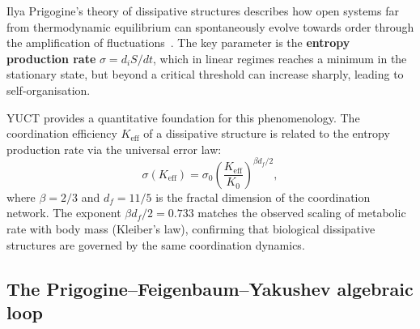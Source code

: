 \documentclass[11pt,a4paper]{article}
\newcommand{\Keff}{K_{\mathrm{eff}}}
\begin{document}
	Ilya Prigogine's theory of dissipative structures describes how open systems far from thermodynamic equilibrium can spontaneously evolve towards order through the amplification of fluctuations~\cite{Prigogine1977}. The key parameter is the \textbf{entropy production rate} \(\sigma = d_iS/dt\), which in linear regimes reaches a minimum in the stationary state, but beyond a critical threshold can increase sharply, leading to self-organisation.
	
	YUCT provides a quantitative foundation for this phenomenology. The coordination efficiency \(K_{\mathrm{eff}}\) of a dissipative structure is related to the entropy production rate via the universal error law:
	\begin{equation}
		\sigma(\Keff) = \sigma_0 \left( \frac{\Keff}{K_0} \right)^{\beta d_f / 2},
		\label{eq:sigma-keff}
	\end{equation}
	where \(\beta = 2/3\) and \(d_f = 11/5\) is the fractal dimension of the coordination network. The exponent \(\beta d_f / 2 = 0.733\) matches the observed scaling of metabolic rate with body mass (Kleiber's law), confirming that biological dissipative structures are governed by the same coordination dynamics.
	
	\subsection{The Prigogine–Feigenbaum–Yakushev algebraic loop}
	
\end{document}
